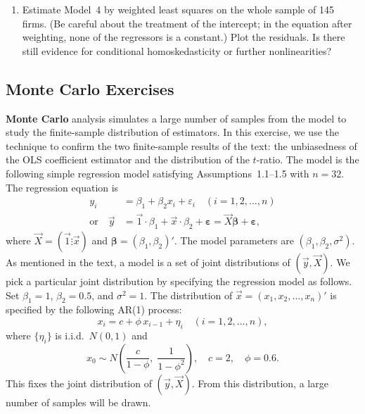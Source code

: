 \begin{problemset}
\begin{enumerate}[label=(\alph*)]
\medskip
\noindent
\textit{Model~4:}
%
\begin{align*}
\log\!\left(\frac{TC_i}{p_{i3}}\right)
&= \beta_1 + \beta_2\,\log(Q_i) + \beta_3\,[\log(Q_i)]^2 \\
&\quad + \beta_4\,\log\!\left(\frac{p_{i1}}{p_{i3}}\right)
       + \beta_5\,\log\!\left(\frac{p_{i2}}{p_{i3}}\right)
       + \varepsilon_i \\[6pt]
\E(\varepsilon_i^2 \mid \vec{X})
&= \sigma^2 \cdot \left(0.0565 + \frac{2.1377}{Q_i}\right)
\quad (i = 1, 2, \ldots, 145)
\end{align*}
%
for some unknown $\sigma^2$.

\item Estimate Model~4 by weighted least squares on the whole sample of
145 firms. (Be careful about the treatment of the intercept; in the equation
after weighting, none of the regressors is a constant.) Plot the residuals.
Is there still evidence for conditional homoskedasticity or further
nonlinearities?
\end{enumerate}

\subsection*{Monte Carlo Exercises}

\textbf{Monte Carlo} analysis simulates a large number of samples from the
model to study the finite-sample distribution of estimators. In this
exercise, we use the technique to confirm the two finite-sample results of
the text: the unbiasedness of the OLS coefficient estimator and the
distribution of the $t$-ratio. The model is the following simple regression
model satisfying Assumptions~1.1--1.5 with $n = 32$. The regression equation
is
%
\begin{align*}
y_i &= \beta_1 + \beta_2 x_i + \varepsilon_i
\quad (i = 1, 2, \ldots, n) \\
\text{or}\quad
\vec{y} &= \vec{1} \cdot \beta_1 + \vec{x} \cdot \beta_2 + \bm{\varepsilon}
= \vec{X}\bm{\beta} + \bm{\varepsilon}, \tag{$*$}
\end{align*}
%
where $\vec{X} = (\vec{1} \vdots \vec{x})$ and
$\bm{\beta} = (\beta_1, \beta_2)'$. The model parameters are
$(\beta_1, \beta_2, \sigma^2)$. As mentioned in the text, a model is a set
of joint distributions of $(\vec{y}, \vec{X})$. We pick a particular joint
distribution by specifying the regression model as follows. Set
$\beta_1 = 1$, $\beta_2 = 0.5$, and $\sigma^2 = 1$. The distribution of
$\vec{x} = (x_1, x_2, \ldots, x_n)'$ is specified by the following AR(1)
process:
%
\begin{equation}
x_i = c + \phi\, x_{i-1} + \eta_i \quad (i = 1, 2, \ldots, n),
\tag{$**$}
\end{equation}
%
where $\{\eta_i\}$ is i.i.d.\ $N(0, 1)$ and
%
\[
x_0 \sim N\!\left(\frac{c}{1 - \phi},\; \frac{1}{1 - \phi^2}\right),
\quad c = 2, \quad \phi = 0.6.
\]
%
This fixes the joint distribution of $(\vec{y}, \vec{X})$. From this
distribution, a large number of samples will be drawn.


\end{problemset}
